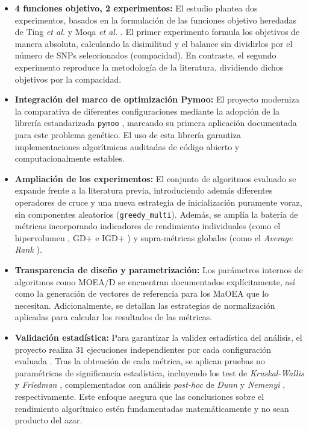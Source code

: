 \begin{itemize}
    \item \textbf{4 funciones objetivo, 2 experimentos:} El estudio plantea dos experimentos, basados en la formulación de las funciones objetivo heredadas de Ting \textit{et al.} \cite{ting2010multi} y Moqa \textit{et al.} \cite{moqa2022assessing}. El primer experimento formula los objetivos de manera absoluta, calculando la disimilitud y el balance sin dividirlos por el número de SNPs seleccionados (compacidad). En contraste, el segundo experimento reproduce la metodología de la literatura, dividiendo dichos objetivos por la compacidad.
    \item \textbf{Integración del marco de optimización Pymoo:} El proyecto moderniza la comparativa de diferentes configuraciones mediante la adopción de la librería estandarizada \texttt{pymoo} \cite{pymoo}, marcando su primera aplicación documentada para este problema genético. El uso de esta librería garantiza implementaciones algorítmicas auditadas de código abierto y computacionalmente estables.
    \item \textbf{Ampliación de los experimentos:} El conjunto de algoritmos evaluado se expande frente a la literatura previa, introduciendo además diferentes operadores de cruce y una nueva estrategia de inicialización puramente voraz, sin componentes aleatorios (\texttt{greedy\_multi}). Además, se amplía la batería de métricas incorporando indicadores de rendimiento individuales (como el hipervolumen \cite{zitzler1999multiobjective}, GD+ e IGD+ \cite{ishibuchi2015igd}) y supra-métricas globales (como el \textit{Average Rank} \cite{demsar2006statistical}).
    \item \textbf{Transparencia de diseño y parametrización:} Los parámetros internos de algoritmos como MOEA/D se encuentran documentados explícitamente, así como la generación de vectores de referencia para los MaOEA que lo necesitan. Adicionalmente, se detallan las estrategias de normalización aplicadas para calcular los resultados de las métricas.
    \item \textbf{Validación estadística:} Para garantizar la validez estadística del análisis, el proyecto realiza 31 ejecuciones independientes por cada configuración evaluada \cite{granado2020multiobjective}. Tras la obtención de cada métrica, se aplican pruebas no paramétricas de significancia estadística, incluyendo los test de \textit{Kruskal-Wallis} \cite{kruskal1952use} y \textit{Friedman} \cite{friedman1937use}, complementados con análisis \textit{post-hoc} de \textit{Dunn} \cite{dunn1964multiple} y \textit{Nemenyi} \cite{nemenyi1963distribution}, respectivamente. Este enfoque asegura que las conclusiones sobre el rendimiento algorítmico estén fundamentadas matemáticamente y no sean producto del azar.

\end{itemize}
